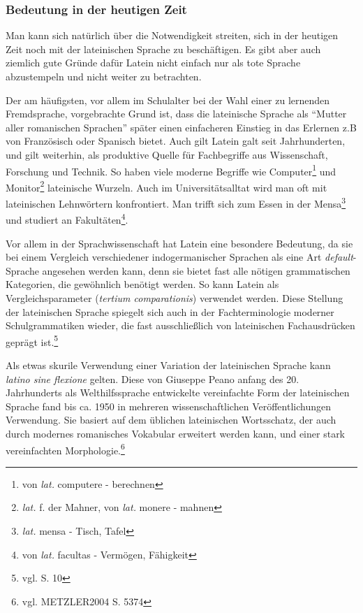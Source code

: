 \documentclass[12pt,abstract=on]{scrreprt}
\begin{document}
\subsubsection{Bedeutung in der heutigen Zeit}
Man kann sich natürlich über die Notwendigkeit streiten, sich in der heutigen Zeit noch mit der lateinischen Sprache zu beschäftigen. Es gibt aber auch ziemlich gute Gründe dafür Latein nicht einfach nur als tote Sprache abzustempeln und nicht weiter zu betrachten. \par
Der am häufigsten, vor allem im Schulalter bei der Wahl einer zu lernenden Fremdsprache, vorgebrachte Grund ist, dass die lateinische Sprache als ``Mutter aller romanischen Sprachen'' später einen einfacheren Einstieg in das Erlernen z.B von Französisch oder Spanisch bietet. Auch gilt Latein galt seit Jahrhunderten, und gilt weiterhin, als produktive Quelle für Fachbegriffe aus Wissenschaft, Forschung und Technik. So haben viele moderne Begriffe wie Computer\footnote{von \textit{lat.} computere - berechnen} und Monitor\footnote{\textit{lat.} f. der Mahner, von \textit{lat.} monere - mahnen} lateinische Wurzeln. Auch im Universitätsalltat wird man oft mit lateinischen Lehnwörtern konfrontiert. Man trifft sich zum Essen in der Mensa\footnote{\textit{lat.} mensa - Tisch, Tafel} und studiert an Fakultäten\footnote{von \textit{lat.} facultas - Vermögen, Fähigkeit}. \par
Vor allem in der Sprachwissenschaft hat Latein eine besondere Bedeutung, da sie bei einem Vergleich verschiedener indogermanischer Sprachen als eine Art \textit{default}-Sprache angesehen werden kann, denn sie bietet fast alle nötigen grammatischen Kategorien, die gewöhnlich benötigt werden. So kann Latein als Vergleichsparameter (\textit{tertium comparationis}) verwendet werden. Diese Stellung der lateinischen Sprache spiegelt sich auch in der Fachterminologie moderner Schulgrammatiken wieder, die fast ausschließlich von lateinischen Fachausdrücken geprägt ist.\footnote{vgl. \cite{MUELLER-LANCE2006} S. 10} \par
Als etwas skurile Verwendung einer Variation der lateinischen Sprache kann \textit{latino sine flexione} gelten. Diese von Giuseppe Peano anfang des 20. Jahrhunderts als Welthilfssprache entwickelte vereinfachte Form der lateinischen Sprache fand bis ca. 1950 in mehreren wissenschaftlichen Veröffentlichungen Verwendung. Sie basiert auf dem üblichen lateinischen Wortsschatz, der auch durch modernes romanisches Vokabular erweitert werden kann, und einer stark vereinfachten Morphologie.\footnote{vgl. METZLER2004 S. 5374}
\pagebreak
\end{document}
